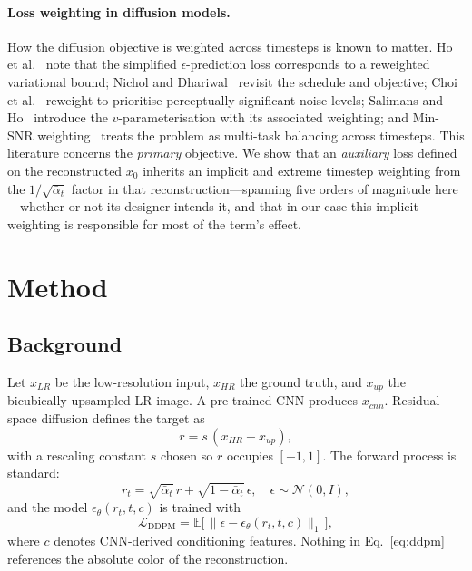 \documentclass[11pt]{article}
\begin{document}
\paragraph{Loss weighting in diffusion models.}
How the diffusion objective is weighted across timesteps is known to matter.
Ho et al.~\cite{ho2020denoising} note that the simplified $\epsilon$-prediction
loss corresponds to a reweighted variational bound; Nichol and
Dhariwal~\cite{nichol2021improved} revisit the schedule and objective;
Choi et al.~\cite{choi2022perception} reweight to prioritise perceptually
significant noise levels; Salimans and Ho~\cite{salimans2022progressive}
introduce the $v$-parameterisation with its associated weighting; and Min-SNR
weighting~\cite{hang2023efficient} treats the problem as multi-task balancing
across timesteps. This literature concerns the \emph{primary} objective. We show
that an \emph{auxiliary} loss defined on the reconstructed $x_0$ inherits an
implicit and extreme timestep weighting from the $1/\sqrt{\bar\alpha_t}$ factor
in that reconstruction---spanning five orders of magnitude here---whether or not
its designer intends it, and that in our case this implicit weighting is
responsible for most of the term's effect.

\section{Method}

\subsection{Background}

Let $x_{LR}$ be the low-resolution input, $x_{HR}$ the ground truth, and
$x_{up}$ the bicubically upsampled LR image. A pre-trained CNN produces
$x_{cnn}$. Residual-space diffusion defines the target as
\begin{equation}
r = s\,(x_{HR} - x_{up}),
\end{equation}
with a rescaling constant $s$ chosen so $r$ occupies $[-1,1]$. The forward
process is standard:
\begin{equation}
r_t = \sqrt{\bar\alpha_t}\,r + \sqrt{1-\bar\alpha_t}\,\epsilon,
\quad \epsilon \sim \mathcal{N}(0, I),
\end{equation}
and the model $\epsilon_\theta(r_t, t, c)$ is trained with
\begin{equation}
\mathcal{L}_{\text{DDPM}} = \mathbb{E}\big[\,\|\epsilon - \epsilon_\theta(r_t,t,c)\|_1\,\big],
\label{eq:ddpm}
\end{equation}
where $c$ denotes CNN-derived conditioning features. Nothing in
Eq.~\ref{eq:ddpm} references the absolute color of the reconstruction.
\end{document}
